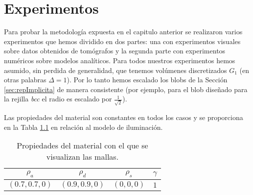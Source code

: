 \chapter{Experimentos}
\label{chap:experimetos}
Para probar la metodología expuesta en el capitulo anterior se realizaron varios experimentos que hemos dividido en dos partes: una con experimentos visuales sobre datos obtenidos de tomógrafos y la segunda parte con experimentos numéricos sobre modelos analíticos. Para todos nuestros experimentos hemos asumido, sin perdida de generalidad, que tenemos volúmenes discretizados $G_{1}$ (en otras palabras $\Delta = 1$). Por lo tanto hemos escalado los blobs de la Sección \ref{sec:repImplicita} de manera consistente (por ejemplo, para el blob diseñado para la rejilla \emph{bcc} el radio es escalado por $\frac{1}{\sqrt{2}}$).

Las propiedades del material son constantes en todos los casos y se proporciona en la Tabla \ref{table:material} en relación al modelo de iluminación. 

\begin{table}[htp]
\begin{center}
  \begin{tabular}{|c|c|c|c|}
    \hline
    $\rho_a$ & $\rho_d$ & $\rho_s$ & $\gamma$ \\
    \hline
    $(0.7, 0.7, 0)$ & $(0.9, 0.9, 0)$ & $(0, 0, 0)$ & $1$  \\
    \hline
  \end{tabular}
\end{center}
\caption[Propiedades del material con el que se visualizan las mallas]{Propiedades del material con el que se visualizan las mallas.}
\label{table:material}
\end{table}
